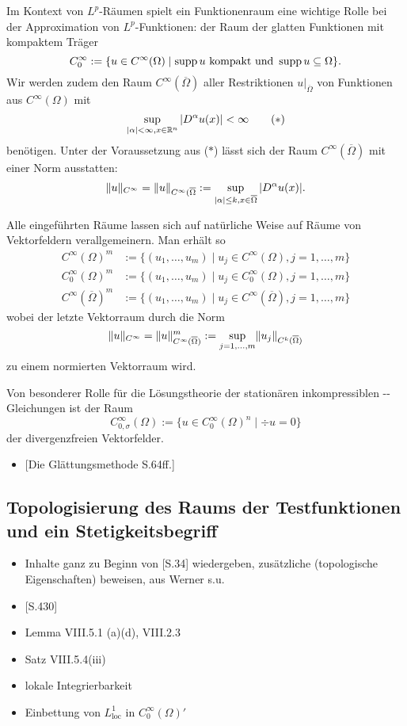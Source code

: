 Im Kontext von $L^p$-Räumen spielt ein Funktionenraum eine wichtige Rolle bei der Approximation von $L^p$-Funktionen: der Raum der glatten Funktionen mit kompaktem Träger
$$
C_0^\infty := \{ u \in C^\infty(\Omega) \mid \operatorname{supp} u \text{ kompakt und } \operatorname{supp} u \subseteq \Omega\}.
$$
Wir werden zudem den Raum $C^\infty(\overline\Omega)$ aller Restriktionen $u|_{\overline\Omega}$ von Funktionen aus $C^\infty(\Omega)$ mit
\begin{displaymath}
  \sup_{|\alpha| < \infty, x \in \mathbb{R}^n} |D^\alpha u(x)| < \infty \tag{$\ast$}
\end{displaymath}
benötigen.
Unter der Voraussetzung aus ($\ast$) lässt sich der Raum $C^\infty(\overline\Omega)$ mit einer Norm ausstatten:
$$
\lVert u \rVert_{C^\infty} = \lVert u \rVert_{C^\infty(\overline\Omega} := \sup_{|\alpha|\leq k, x \in \overline\Omega} |D^\alpha u(x)|.
$$

Alle eingeführten Räume lassen sich auf natürliche Weise auf Räume von Vektorfeldern verallgemeinern.
Man erhält so
\begin{align*}
  C^\infty(\Omega)^m &:= \{(u_1,\dots,u_m) \mid u_j \in C^\infty(\Omega), j = 1,\dots,m\} \\
  C_0^\infty(\Omega)^m &:= \{(u_1,\dots,u_m) \mid u_j \in C_0^\infty(\Omega), j = 1,\dots,m\} \\
  C^\infty(\overline\Omega)^m &:= \{(u_1,\dots,u_m) \mid u_j \in C^\infty(\overline\Omega), j = 1,\dots,m\} 
\end{align*}
wobei der letzte Vektorraum durch die Norm
$$
\lVert u \rVert_{C^\infty} = \lVert u \rVert_{C^\infty(\overline\Omega)}^m := \sup_{j = 1,\dots, m} \lVert u_j \rVert_{C^k(\overline\Omega)}
$$
zu einem normierten Vektorraum wird.

Von besonderer Rolle für die Lösungstheorie der stationären inkompressiblen \navier\hyp{}\stokes\hyp{}Gleichungen ist der Raum
$$
C_{0,\sigma}^\infty(\Omega) := \{u \in C_0^\infty(\Omega)^n \mid \div u = 0\}
$$
der divergenzfreien Vektorfelder.

\begin{itemize}
  \item \cite{sohr2001navier}[Die Glättungsmethode S.64ff.]
\end{itemize}

\subsection{Topologisierung des Raums der Testfunktionen und ein Stetigkeitsbegriff}

\begin{itemize}
  \item Inhalte ganz zu Beginn von \cite{sohr2001navier}[S.34] wiedergeben, zusätzliche (topologische Eigenschaften) beweisen, aus Werner s.u.
  \item \cite{werner2011fa}[S.430]
  \item Lemma VIII.5.1 (a)(d), VIII.2.3
  \item Satz VIII.5.4(iii)
  \item lokale Integrierbarkeit
  \item Einbettung von $L^1_{\mathrm{loc}}$ in $C_0^\infty(\Omega)'$
\end{itemize}

